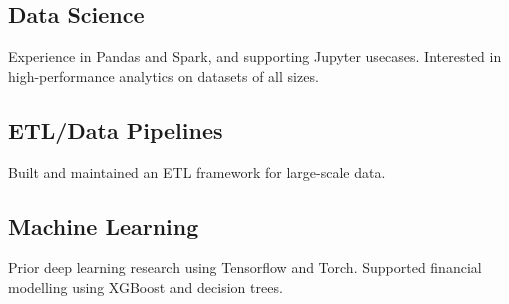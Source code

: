 \documentclass[11pt]{article}
\begin{document}
  \subsection*{Data Science}

  Experience in Pandas and Spark, and supporting Jupyter usecases.
  Interested in high-performance analytics on datasets of all sizes.

  \subsection*{ETL/Data Pipelines}

  Built and maintained an ETL framework for large-scale data.

  \subsection*{Machine Learning}

  Prior deep learning research using Tensorflow and Torch.
  Supported financial modelling using XGBoost and decision trees.
\end{document}
